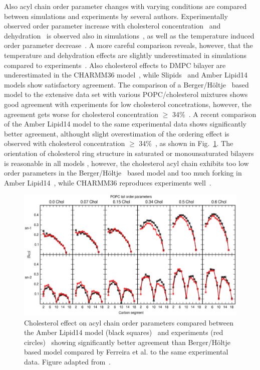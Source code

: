 \documentclass[aps,prl,superscriptaddress,twocolumn]{revtex4}
\begin{document}
Also acyl chain order parameter changes with varying conditions are compared between simulations and experiments
by several authors. Experimentally observed order parameter increase with cholesterol 
concentration~\cite{dufourc84,lafleur90,douliez95,urbina95,vermeer07,ferreira13} and dehydration~\cite{mallikarjunaiah11,dvinskikh05b} 
is observed also in simulations~\cite{mashl01,hogberg06,vermeer07,zhu07,lim12,ferreira13,jambeck13,madej15},
as well as the temperature induced order parameter decrease~\cite{douliez95,zhuang14}.
A more careful comparison reveals, however, that the temperature and dehydration effects are slightly underestimated in simulations 
compared to experiments~\cite{hogberg06,zhuang14}. Also cholesterol effects to DMPC bilayer are underestimated in the CHARMM36 model~\cite{lim12},
while Slipids~\cite{jambeck13} and Amber Lipid14~\cite{madej15} models show satisfactory agreement.
The comparison of a Berger/H{\"o}ltje~\cite{berger97,holtje01} based model to the extensive data set with 
various POPC/cholesterol mixtures shows good agreement with experiments for low cholesterol concetrations, 
however, the agreement gets worse for cholesterol concentration $\ge$ 34\%~\cite{ferreira13}. 
A recent comparison of the Amber Lipid14 model to the same experimental data shows significantly better 
agreement, althought slight overestimation of the ordering effect is observed with cholesterol concentration $\ge$ 34\%~\cite{madej15}, 
as shown in Fig.~\ref{cholTAILmadej}. The orientation of cholesterol ring structure in saturated or monounsaturated bilayers
is reasonable in all models \cite{vermeer07,lim12,ferreira13,madej15}, 
however, the cholesterol acyl chain exhibits too low order parameters in the Berger/H{\"o}ltje~\cite{berger97,holtje01} 
based model \cite{ferreira13} and too much forking in Amber Lipid14~\cite{madej15}, while CHARMM36 reproduces experiments well~\cite{lim12}. 
\begin{figure}[]
  \includegraphics[width=17.2cm]{../Fig/cholTAILmadej.eps}
\newline
  \caption{\label{cholTAILmadej}
    Cholesterol effect on acyl chain order parameters compared between the Amber Lipid14 model (black squares)~\cite{madej15} and experiments (red circles)~\cite{ferreira13}
    showing significantly better agreement than Berger/H{\"o}ltje based model compared by Ferreira et al. \cite{ferreira13} to the same experimental data.
    Figure adapted from~\cite{madej15}. 
  } 
\end{figure}
\end{document}

